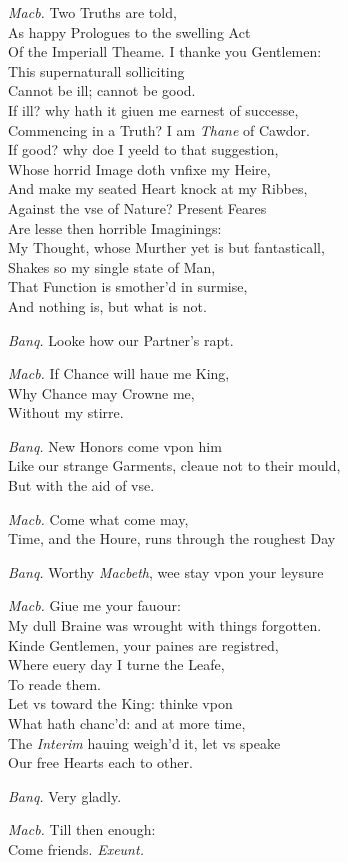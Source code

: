 \documentclass[12pt]{sides}
\newcommand{\dia}[1]{\hskip 10pt\textit{#1}\hskip 6pt}
\begin{document}
\begin{multicols}{2}
            \dia{Macb.} Two Truths are told, \\ As happy Prologues to the swelling Act \\ Of the Imperiall Theame. I thanke you Gentlemen: \\ This supernaturall solliciting \\ Cannot be ill; cannot be good. \\ If ill? why hath it giuen me earnest of successe, \\ Commencing in a Truth? I am \textit{Thane} of Cawdor. \\ If good? why doe I yeeld to that suggestion, \\ Whose horrid Image doth vnfixe my Heire, \\ And make my seated Heart knock at my Ribbes, \\ Against the vse of Nature? Present Feares \\ Are lesse then horrible Imaginings: \\ My Thought, whose Murther yet is but fantasticall, \\ Shakes so my single state of Man, \\ That Function is smother'd in surmise, \\ And nothing is, but what is not.

            \dia{Banq.} Looke how our Partner's rapt.

            \dia{Macb.} If Chance will haue me King, \\ Why Chance may Crowne me, \\ Without my stirre.

            \dia{Banq.} New Honors come vpon him \\ Like our strange Garments, cleaue not to their mould, \\ But with the aid of vse.

            \dia{Macb.} Come what come may, \\ Time, and the Houre, runs through the roughest Day

            \dia{Banq.} Worthy \textit{Macbeth}, wee stay vpon your leysure

            \dia{Macb.} Giue me your fauour: \\ My dull Braine was wrought with things forgotten. \\ Kinde Gentlemen, your paines are registred, \\ Where euery day I turne the Leafe, \\ To reade them. \\ Let vs toward the King: thinke vpon \\ What hath chanc'd: and at more time, \\ The \textit{Interim} hauing weigh'd it, let vs speake \\ Our free Hearts each to other.

            \dia{Banq.} Very gladly.

            \dia{Macb.} Till then enough: \\ Come friends. \hfill \textit{Exeunt.}

	\end{multicols}
\end{document}
